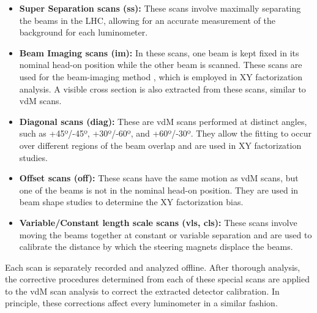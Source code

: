 \begin{itemize}
    \item \textbf{Super Separation scans (ss):} These scans involve maximally separating the beams in the LHC, allowing for an accurate measurement of the background for each luminometer.
    \item \textbf{Beam Imaging scans (im):} In these scans, one beam is kept fixed in its nominal head-on position while the other beam is scanned. These scans are used for the beam-imaging method \cite{Klute_2017}, which is employed in XY factorization analysis. A visible cross section is also extracted from these scans, similar to vdM scans.
    \item \textbf{Diagonal scans (diag):} These are vdM scans performed at distinct angles, such as +45º/-45º, +30º/-60º, and +60º/-30º. They allow the fitting to occur over different regions of the beam overlap and are used in XY factorization studies.
    \item \textbf{Offset scans (off):} These scans have the same motion as vdM scans, but one of the beams is not in the nominal head-on position. They are used in beam shape studies to determine the XY factorization bias.
    \item \textbf{Variable/Constant length scale scans (vls, cls):} These scans involve moving the beams together at constant or variable separation and are used to calibrate the distance by which the steering magnets displace the beams.
\end{itemize}

Each scan is separately recorded and analyzed offline. After thorough analysis, the corrective procedures determined from each of these special scans are applied to the vdM scan analysis to correct the extracted detector calibration. In principle, these corrections affect every luminometer in a similar fashion.
